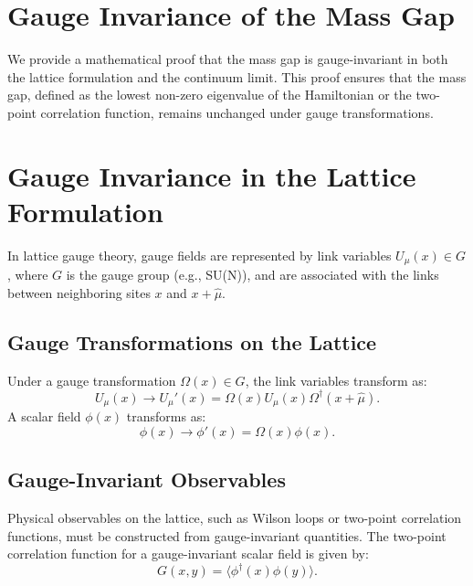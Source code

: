 \section{Gauge Invariance of the Mass Gap}

We provide a mathematical proof that the mass gap is gauge-invariant in both 
the lattice formulation and the continuum limit. This proof ensures that the 
mass gap, defined as the lowest non-zero eigenvalue of the Hamiltonian or the 
two-point correlation function, remains unchanged under gauge transformations.



\section{Gauge Invariance in the Lattice Formulation}

In lattice gauge theory, gauge fields are represented by link variables \(U_\mu(x) \in G\), where \(G\) is the gauge group (e.g., SU(N)), and are associated with the links between neighboring sites \(x\) and \(x + \hat{\mu}\).

\subsection{Gauge Transformations on the Lattice}

Under a gauge transformation \(\Omega(x) \in G\), the link variables transform as:
\begin{equation}
U_\mu(x) \rightarrow U_\mu'(x) = \Omega(x) U_\mu(x) \Omega^\dagger(x + \hat{\mu}).
\end{equation}
A scalar field \(\phi(x)\) transforms as:
\begin{equation}
\phi(x) \rightarrow \phi'(x) = \Omega(x) \phi(x).
\end{equation}

\subsection{Gauge-Invariant Observables}

Physical observables on the lattice, such as Wilson loops or two-point correlation functions, must be constructed from gauge-invariant quantities. The two-point correlation function for a gauge-invariant scalar field is given by:
\begin{equation}
G(x, y) = \langle \phi^\dagger(x) \phi(y) \rangle.
\end{equation}

